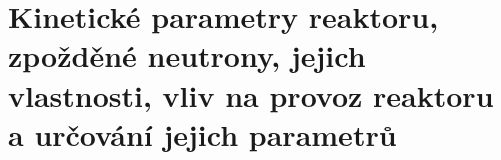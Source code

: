 \section[Měření kinetických parametrů]{Kinetické parametry reaktoru, zpožděné neutrony, jejich vlastnosti, vliv na provoz reaktoru a určování jejich parametrů}

